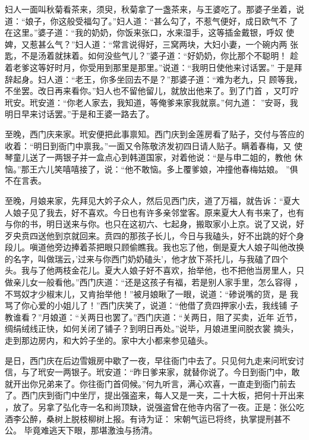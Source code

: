 妇人一面叫秋菊看茶来，须臾，秋菊拿了一盏茶来，与王婆吃了。那婆子坐着，说
道：“娘子，你这般受福勾了。”妇人道：“甚么勾了，不惹气便好，成日欧气不
了在这里。”婆子道：“我的奶奶，你饭来张口，水来湿手，这等插金戴银，呼奴
使婢，又惹甚么气？”妇人道：“常言说得好，三窝两块，大妇小妻，一个碗内两
张匙，不是汤着就抹着。如何没些气儿？”婆子道：“好奶奶，你比那个不聪明！
趁着老爹这等好时月，你受用到那里是那里。”说道：“我明日使他来讨话罢。”
于是拜辞起身。妇人道：“老王，你多坐回去不是？”那婆子道：“难为老九，只
顾等我，不坐罢。改日再来看你。”妇人也不留他留儿，就放出他来了。到了门首
，又叮咛玳安。玳安道：“你老人家去，我知道，等俺爹来家我就禀。”何九道：
”安哥，我明日早来讨话罢。”于是和王婆一路去了。

至晚，西门庆来家。玳安便把此事禀知。西门庆到金莲房看了贴子，交付与答应的
收着：“明日到衙门中禀我。”一面又令陈敬济发初四日请人贴子。瞒着春梅，又
使琴童儿送了一两银子并一盒点心到韩道国家，对着他说：“是与申二姐的，教他
休恼。”那王六儿笑嘻嘻接了，说：“他不敢恼。多上覆爹娘，冲撞他春梅姑娘。
”俱不在言表。

至晚，月娘来家，先拜见大妗子众人，然后见西门庆，道了万福，就告诉：“夏大
人娘子见了我去，好不喜欢。今日也有许多亲邻堂客。原来夏大人有书来了，也有
与你的书，明日送来与你。也只在这初六、七起身，搬取家小上京。说了又说，好
歹央贲四送他到京就回来。贲四的那孩子长儿，今日与我磕头，好不出跳的好个身
段儿。嗔道他旁边捧着茶把眼只顾偷瞧我。我也忘了他，倒是夏大人娘子叫他改换
的名字，叫做瑞云，'过来与你西门奶奶磕头'，他才放下茶托儿，与我磕了四个
头。我与了他两枝金花儿。夏大人娘子好不喜欢，抬举他，也不把他当房里人，只
做亲儿女一般看他。”西门庆道：“还是这孩子有福，若是别人家手里，怎么容得
，不骂奴才少椒末儿，又肯抬举他！”被月娘瞅了一眼，说道：“碜说嘴的货，是
我骂了你心爱的小姐儿了！”西门庆笑了，说道：“他借了贲四押家小去，我线铺
子教谁看？”月娘道：“关两日也罢了。”西门庆道：“关两日，阻了买卖，近年
近节，绸绢绒线正快，如何关闭了铺子？到明日再处。”说毕，月娘进里间脱衣裳
摘头，走到那边房内，和大妗子坐的。家中大小都来参见磕头。

是日，西门庆在后边雪娥房中歇了一夜，早往衙门中去了。只见何九走来问玳安讨
信，与了玳安一两银子。玳安道：“昨日爹来家，就替你说了。今日到衙门中，敢
就开出你兄弟来了。你往衙门首伺候。”何九听言，满心欢喜，一直走到衙门前去
了。西门庆到衙门中坐厅，提出强盗来，每人又是一夹，二十大板，把何十开出来
，放了。另拿了弘化寺一名和尚顶缺，说强盗曾在他寺内宿了一夜。正是：张公吃
酒李公醉，桑树上脱枝柳树上报。有诗为证：
宋朝气运已将终，执掌提刑甚不公。
毕竟难逃天下眼，那堪激浊与扬清。

